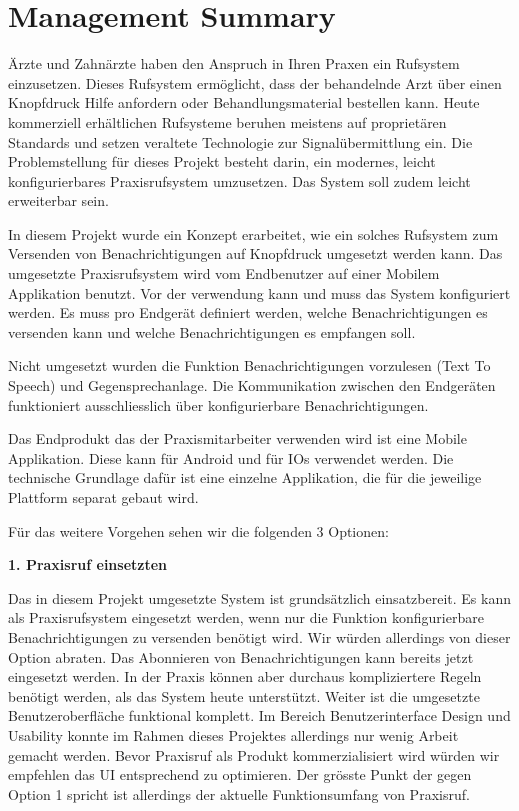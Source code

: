 \section*{Management Summary}

Ärzte und Zahnärzte haben den Anspruch in Ihren Praxen ein Rufsystem einzusetzen.
Dieses Rufsystem ermöglicht, dass der behandelnde Arzt über einen Knopfdruck Hilfe anfordern oder Behandlungsmaterial bestellen kann.
Heute kommerziell erhältlichen Rufsysteme beruhen meistens auf proprietären Standards und setzen veraltete Technologie zur Signalübermittlung ein. \cite{TODO: Add Citation!}
Die Problemstellung für dieses Projekt besteht darin, ein modernes, leicht konfigurierbares Praxisrufsystem umzusetzen.
Das System soll zudem leicht erweiterbar sein.

In diesem Projekt wurde ein Konzept erarbeitet, wie ein solches Rufsystem zum Versenden von Benachrichtigungen auf Knopfdruck umgesetzt werden kann.
Das umgesetzte Praxisrufsystem wird vom Endbenutzer auf einer Mobilem Applikation benutzt.
Vor der verwendung kann und muss das System konfiguriert werden.
Es muss pro Endgerät definiert werden, welche Benachrichtigungen es versenden kann und welche Benachrichtigungen es empfangen soll.

Nicht umgesetzt wurden die Funktion Benachrichtigungen vorzulesen (Text To Speech) und Gegensprechanlage.
Die Kommunikation zwischen den Endgeräten funktioniert ausschliesslich über konfigurierbare Benachrichtigungen.

Das Endprodukt das der Praxismitarbeiter verwenden wird ist eine Mobile Applikation.
Diese kann für Android und für IOs verwendet werden.
Die technische Grundlage dafür ist eine einzelne Applikation, die für die jeweilige Plattform separat gebaut wird.

Für das weitere Vorgehen sehen wir die folgenden 3 Optionen:


\textbf{1. Praxisruf einsetzten}

Das in diesem Projekt umgesetzte System ist grundsätzlich einsatzbereit.
Es kann als Praxisrufsystem eingesetzt werden, wenn nur die Funktion konfigurierbare Benachrichtigungen zu versenden benötigt wird.
Wir würden allerdings von dieser Option abraten.
Das Abonnieren von Benachrichtigungen kann bereits jetzt eingesetzt werden.
In der Praxis können aber durchaus kompliziertere Regeln benötigt werden, als das System heute unterstützt.
Weiter ist die umgesetzte Benutzeroberfläche funktional komplett.
Im Bereich Benutzerinterface Design und Usability konnte im Rahmen dieses Projektes allerdings nur wenig Arbeit gemacht werden.
Bevor Praxisruf als Produkt kommerzialisiert wird würden wir empfehlen das UI entsprechend zu optimieren.
Der grösste Punkt der gegen Option 1 spricht ist allerdings der aktuelle Funktionsumfang von Praxisruf.

